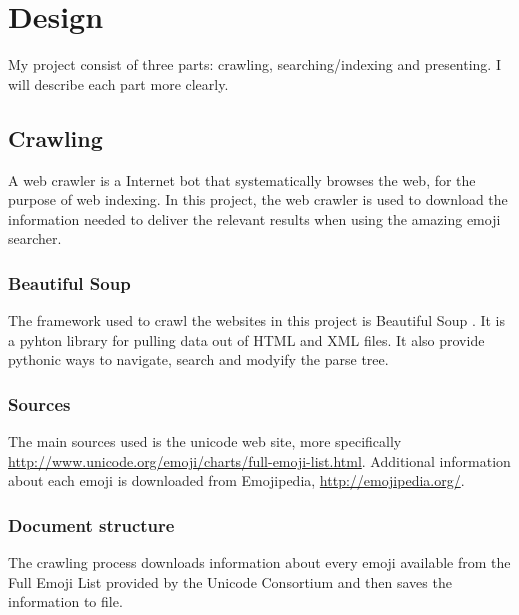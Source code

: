 \documentclass[a4paper]{article}
\begin{document}


\section{Design} %
\label{sec:design}

My project consist of three parts: crawling, searching/indexing and presenting. I will describe each part more clearly.

\subsection{Crawling} %
\label{sub:crawling}

A web crawler is a Internet bot that systematically browses the web, for the purpose of web indexing. In this project, the web crawler is used to download the information needed to deliver the relevant results when using the amazing emoji searcher.

\subsubsection{Beautiful Soup} %
\label{ssub:beautiful_soup}

The framework used to crawl the websites in this project is Beautiful Soup \cite{ bs}. It is a pyhton library for pulling data out of HTML and XML files. It also provide pythonic ways to navigate, search and modyify the parse tree. 


\subsubsection{Sources} %
\label{ssub:sources}

The main sources used is the unicode web site, more specifically \url{http://www.unicode.org/emoji/charts/full-emoji-list.html}. Additional information about each emoji is downloaded from Emojipedia, \url{http://emojipedia.org/}.


\subsubsection{Document structure} %
\label{ssub:document_structure}

The crawling process downloads information about every emoji available from the Full Emoji List provided by the Unicode Consortium and then saves the information to file. 
\end{document}
